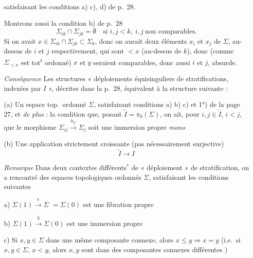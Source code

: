 \documentclass[11pt,a4paper]{article}
\begin{document}

satisfaisant les conditions a) c), d) de p.~28.

Montrons aussi la condition b) de p.~28
\[
\Sigma_{ik}\cap\Sigma_{jk}=\emptyset\quad\text{si } i,j<k,\ i,j\ \text{non comparables.}
\]
Si on avait $x\in\Sigma_{ik}\cap\Sigma_{jk}\subset\Sigma_k$, donc on aurait deux éléments $x_i$ et $x_j$ de $\Sigma$, au-dessus de $i$ et $j$ respectivement, qui sont $<x$ (au-dessus de $k$), donc (comme $\Sigma_{<x}$ est tot\textsuperscript{t} ordonné)  $x$ et $y$ seraient comparables, donc aussi $i$ et $j$, absurde.

\emph{Conséquence} Les structures « déploiements équisinguliers de stratifications, indexées par $I$ », décrites dans la p.~28, équivalent à la structure suivante :

(a) Un \struck{\ill{}} espace top.\ ordonné $\Sigma$, satisfaisant  conditions a) b) c) et 1°) de la page 27, et \emph{de plus} : la condition \struck{\ill{}} que,  posant $\widetilde I=\pi_0(\Sigma)$, on ait, pour $i,j\in\widetilde I$, $i<j$, que le morphisme  $\Sigma_{ij}\xrightarrow{b_{ij}}\Sigma_j$ soit une immersion propre \emph{mono}

(b) Une application strictement croissante (pas nécessairement surjective)
\[
\widetilde I\longrightarrow I
\]



\emph{Remarque} Dans deux contextes différents${}^{*}$ de « déploiement » de \struck{\ill{}} stratification, on a rencontré des espaces topologiques ordonnés $\Sigma$, satisfaisant les conditions suivantes


a) $\Sigma(1)\xrightarrow{\underline s}\Sigma$ \struck{\ill{}} $=\Sigma(0)$ est une fibration propre

b) $\Sigma(1)\xrightarrow{\underline b}\Sigma(0)$ est une immersion propre

c) Si $x,y\in\Sigma$  dans une même composante connexe, alors $x\le y\Rightarrow x=y$ (i.e.\ si $x,y\in\Sigma$, $x<y$, alors $x,y$ sont dans des composantes connexes différentes \struck{\ill{}})
\end{document}

